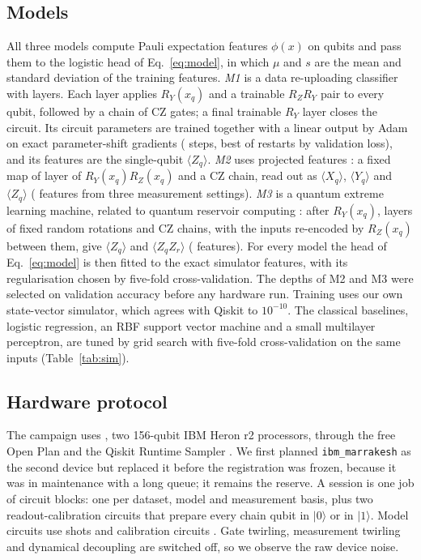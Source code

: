 \subsection{Models}
All three models compute Pauli expectation features $\phi(x)$ on  qubits and
pass them to the logistic head of Eq.~\eqref{eq:model}, in which $\mu$ and $s$ are the mean and
standard deviation of the training features. \emph{M1} is a data re-uploading
classifier \cite{perezsalinas2020reuploading} with  layers. Each layer applies
$R_Y(x_q)$ and a trainable $R_Z R_Y$ pair to every qubit, followed by a chain of CZ gates; a
final trainable $R_Y$ layer closes the circuit. Its  circuit parameters are
trained together with a linear output by Adam on exact parameter-shift gradients
( steps, best of  restarts by validation loss), and its features
are the  single-qubit $\langle Z_q\rangle$. \emph{M2} uses projected features
\cite{huang2021power}: a fixed map of  layer of $R_Y(x_q)R_Z(x_q)$ and a CZ chain,
read out as $\langle X_q\rangle$, $\langle Y_q\rangle$ and $\langle Z_q\rangle$
( features from three measurement settings). \emph{M3} is a quantum extreme
learning machine, related to quantum reservoir computing \cite{yasuda2023qrc}: after $R_Y(x_q)$,
 layers of fixed random rotations and CZ chains, with the inputs re-encoded by
$R_Z(x_q)$ between them, give $\langle Z_q\rangle$ and $\langle Z_qZ_r\rangle$
( features). For every model the head of Eq.~\eqref{eq:model} is then fitted to
the exact simulator features, with its regularisation chosen by five-fold cross-validation. The
depths of M2 and M3 were selected on validation accuracy before any hardware run. Training uses
our own state-vector simulator, which agrees with Qiskit to $10^{-10}$. The classical
baselines, logistic regression, an RBF support vector machine and a small multilayer
perceptron, are tuned by grid search with five-fold cross-validation on the same inputs
(Table~\ref{tab:sim}).

\subsection{Hardware protocol}
The campaign uses , two 156-qubit IBM Heron r2 processors, through the free Open
Plan and the Qiskit Runtime Sampler \cite{javadiabhari2024qiskit}. We first planned
\texttt{ibm\_marrakesh} as the second device but replaced it before the registration was frozen,
because it was in maintenance with a long queue; it remains the reserve. A session is one job of
 circuit blocks: one per dataset, model and measurement basis, plus two
readout-calibration circuits that prepare every chain qubit in $|0\rangle$ or in $|1\rangle$. Model
circuits use  shots and calibration circuits . Gate twirling,
measurement twirling and dynamical decoupling are switched off, so we observe the raw device
noise.

